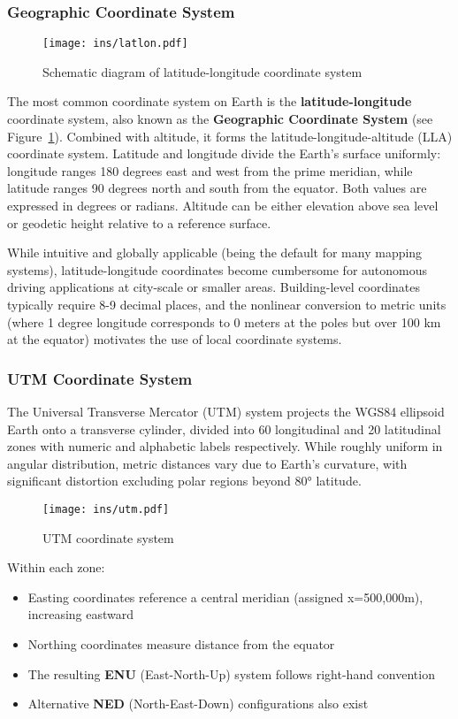 \subsubsection{Geographic Coordinate System}
\begin{figure}
	\centering
	\texttt{[image: ins/latlon.pdf]}
	\caption{Schematic diagram of latitude-longitude coordinate system}
	\label{fig:latlon}
\end{figure}

The most common coordinate system on Earth is the \textbf{latitude-longitude} coordinate system, also known as the \textbf{Geographic Coordinate System} (see Figure~\ref{fig:latlon}). Combined with altitude, it forms the latitude-longitude-altitude (LLA) coordinate system. Latitude and longitude divide the Earth's surface uniformly: longitude ranges 180 degrees east and west from the prime meridian, while latitude ranges 90 degrees north and south from the equator. Both values are expressed in degrees or radians. Altitude can be either elevation above sea level or geodetic height relative to a reference surface.

While intuitive and globally applicable (being the default for many mapping systems), latitude-longitude coordinates become cumbersome for autonomous driving applications at city-scale or smaller areas. Building-level coordinates typically require 8-9 decimal places, and the nonlinear conversion to metric units (where 1 degree longitude corresponds to 0 meters at the poles but over 100 km at the equator) motivates the use of local coordinate systems.

\subsubsection{UTM Coordinate System}
The Universal Transverse Mercator (UTM) system projects the WGS84 ellipsoid Earth onto a transverse cylinder, divided into 60 longitudinal and 20 latitudinal zones with numeric and alphabetic labels respectively. While roughly uniform in angular distribution, metric distances vary due to Earth's curvature, with significant distortion excluding polar regions beyond 80° latitude.

\begin{figure}
	\centering
	\texttt{[image: ins/utm.pdf]}
	\caption{UTM coordinate system}
	\label{fig:utm}
\end{figure}

Within each zone:
\begin{itemize}
	\item Easting coordinates reference a central meridian (assigned x=500,000m), increasing eastward
	\item Northing coordinates measure distance from the equator
	\item The resulting \textbf{ENU} (East-North-Up) system follows right-hand convention
	\item Alternative \textbf{NED} (North-East-Down) configurations also exist
\end{itemize}

